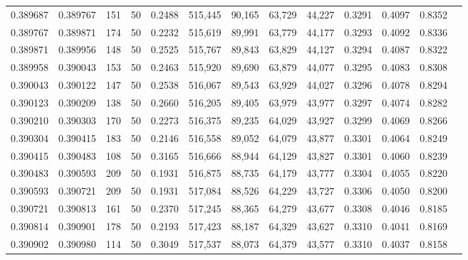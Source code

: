 \begin{tabular}{rrrrrrrrrrrrr}
0.389687 & 0.389767 &   151 &  50 &                                     0.2488 & 515,445 &  90,165 &  63,729 &  44,227 & 0.3291 & 0.4097 & 0.8352 \\
0.389767 & 0.389871 &   174 &  50 &                                     0.2232 & 515,619 &  89,991 &  63,779 &  44,177 & 0.3293 & 0.4092 & 0.8336 \\
0.389871 & 0.389956 &   148 &  50 &                                     0.2525 & 515,767 &  89,843 &  63,829 &  44,127 & 0.3294 & 0.4087 & 0.8322 \\
0.389958 & 0.390043 &   153 &  50 &                                     0.2463 & 515,920 &  89,690 &  63,879 &  44,077 & 0.3295 & 0.4083 & 0.8308 \\
0.390043 & 0.390122 &   147 &  50 &                                     0.2538 & 516,067 &  89,543 &  63,929 &  44,027 & 0.3296 & 0.4078 & 0.8294 \\
0.390123 & 0.390209 &   138 &  50 &                                     0.2660 & 516,205 &  89,405 &  63,979 &  43,977 & 0.3297 & 0.4074 & 0.8282 \\
0.390210 & 0.390303 &   170 &  50 &                                     0.2273 & 516,375 &  89,235 &  64,029 &  43,927 & 0.3299 & 0.4069 & 0.8266 \\
0.390304 & 0.390415 &   183 &  50 &                                     0.2146 & 516,558 &  89,052 &  64,079 &  43,877 & 0.3301 & 0.4064 & 0.8249 \\
0.390415 & 0.390483 &   108 &  50 &                                     0.3165 & 516,666 &  88,944 &  64,129 &  43,827 & 0.3301 & 0.4060 & 0.8239 \\
0.390483 & 0.390593 &   209 &  50 &                                     0.1931 & 516,875 &  88,735 &  64,179 &  43,777 & 0.3304 & 0.4055 & 0.8220 \\
0.390593 & 0.390721 &   209 &  50 &                                     0.1931 & 517,084 &  88,526 &  64,229 &  43,727 & 0.3306 & 0.4050 & 0.8200 \\
0.390721 & 0.390813 &   161 &  50 &                                     0.2370 & 517,245 &  88,365 &  64,279 &  43,677 & 0.3308 & 0.4046 & 0.8185 \\
0.390814 & 0.390901 &   178 &  50 &                                     0.2193 & 517,423 &  88,187 &  64,329 &  43,627 & 0.3310 & 0.4041 & 0.8169 \\
0.390902 & 0.390980 &   114 &  50 &                                     0.3049 & 517,537 &  88,073 &  64,379 &  43,577 & 0.3310 & 0.4037 & 0.8158 \\

\end{tabular}
